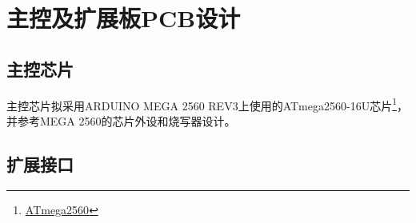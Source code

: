 \chapter{主控及扩展板PCB设计}
\label{cha:PCB}

\section{主控芯片}

主控芯片拟采用ARDUINO MEGA 2560 REV3\cite{arduino_mega-2560-r3}上使用的ATmega2560-16U芯片\footnote{\href{http://www.atmel.com/Images/Atmel-2549-8-bit-AVR-Microcontroller-ATmega640-1280-1281-2560-2561_datasheet.pdf}{ATmega2560}}，并参考MEGA 2560的芯片外设和烧写器设计。

\section{扩展接口}